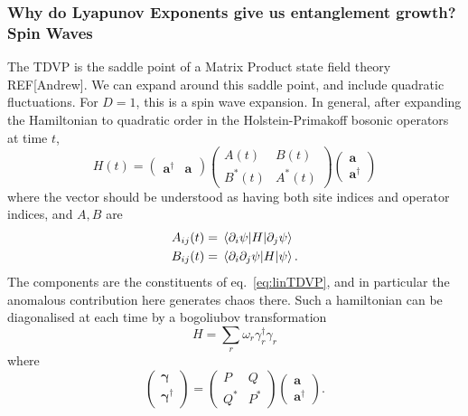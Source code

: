 \documentclass{article}
\let\vec\bm
\begin{document}
\subsubsection{Why do Lyapunov Exponents give us entanglement growth? Spin Waves}
%
The TDVP is the saddle point of a Matrix Product state field theory REF[Andrew].
We can expand around this saddle point, and include quadratic fluctuations.
For $D=1$, this is a spin wave expansion.
In general, after expanding the Hamiltonian to quadratic order in the Holstein-Primakoff bosonic operators at time $t$, 
\begin{equation}
    H(t) = \begin{pmatrix} \vec{a}^\dagger & \vec{a} \end{pmatrix}
           \begin{pmatrix} A(t) & B(t) \\ B^*(t) & A^*(t) \end{pmatrix}
           \begin{pmatrix} \vec{a} \\ \vec{a}^\dagger \end{pmatrix}
\end{equation}
where the vector should be understood as having both site indices and operator indices, and $A, B$ are 
\begin{align}
    A_{ij}(t) &= \mel{\partial_i\psi}{H}{\partial_j\psi}\\
    B_{ij}(t) &= \mel{\partial_i\partial_j\psi}{H}{\psi}.
\end{align}
The components are the constituents of eq.~\ref{eq:linTDVP}, and in particular the anomalous contribution here generates chaos there.
Such a hamiltonian can be diagonalised at each time by a bogoliubov transformation~\cite{colpa}
\begin{equation}
    H = \sum_r \omega_r \gamma_r^\dagger \gamma_r
\end{equation}
where
\begin{equation}
    \begin{pmatrix} \vec{\gamma}\\ \vec{\gamma}^\dagger \end{pmatrix}
    = \begin{pmatrix} P & Q \\ Q^* & P^* \end{pmatrix}
    \begin{pmatrix} \vec{a} \\ \vec{a}^\dagger \end{pmatrix}.
\end{equation}
\end{document}

